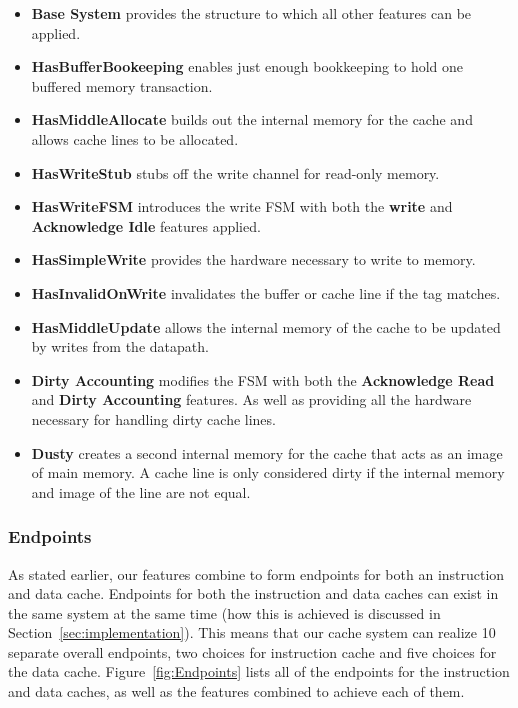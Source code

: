 \documentclass[conference]{IEEEtran}
\begin{document}
\begin{itemize}
    \item \textbf{Base System} provides the structure to which all other features can be applied.
    \item \textbf{HasBufferBookeeping} enables just enough bookkeeping to hold one buffered memory transaction.
    \item \textbf{HasMiddleAllocate} builds out the internal memory for the cache and allows cache lines to be allocated.
    \item \textbf{HasWriteStub} stubs off the write channel for read-only memory.
    \item \textbf{HasWriteFSM} introduces the write FSM with both the \textbf{write} and \textbf{Acknowledge Idle} features applied.
    \item \textbf{HasSimpleWrite} provides the hardware necessary to write to memory.
    \item \textbf{HasInvalidOnWrite} invalidates the buffer or cache line if the tag matches.
    \item \textbf{HasMiddleUpdate} allows the internal memory of the cache to be updated by writes from the datapath.
    \item \textbf{Dirty Accounting} modifies the FSM with both the \textbf{Acknowledge Read} and \textbf{Dirty Accounting} features. As well as providing all the hardware necessary for handling dirty cache lines.
    \item \textbf{Dusty} creates a second internal memory for the cache that acts as an image of main memory. A cache line is only considered dirty if the internal memory and image of the line are not equal.
\end{itemize}

\subsubsection{Endpoints}
As stated earlier, our features combine to form endpoints for both an instruction and data cache. Endpoints for both the instruction and data caches can exist in the same system at the same time (how this is achieved is discussed in Section~\ref{sec:implementation}). This means that our cache system can realize 10 separate overall endpoints, two choices for instruction cache and five choices for the data cache. Figure~\ref{fig:Endpoints} lists all of the endpoints for the instruction and data caches, as well as the features combined to achieve each of them. 
\end{document}
